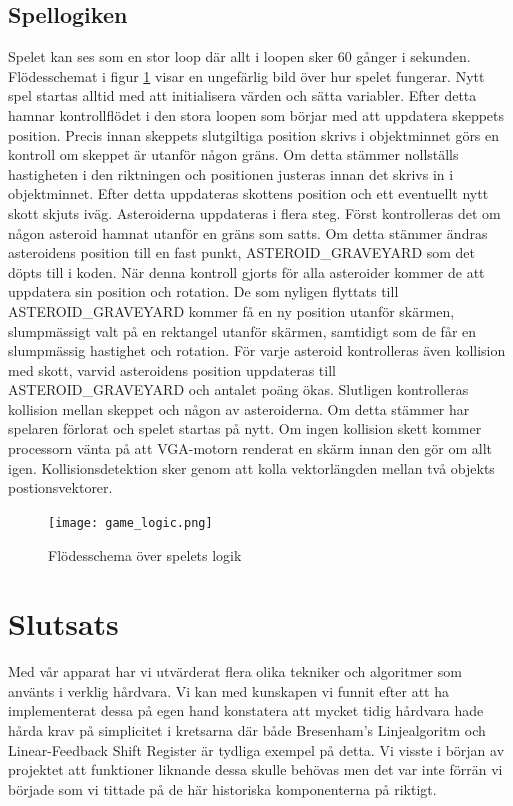 \documentclass[a4paper]{article}
\begin{document}
    \subsection{Spellogiken}
	Spelet kan ses som en stor loop där allt i loopen sker 60 gånger i sekunden. Flödesschemat
	i figur \ref{fig:game_logic} visar en ungefärlig bild över hur spelet fungerar. Nytt spel
	startas alltid med att initialisera värden och sätta variabler. Efter detta hamnar kontrollflödet
	i den stora loopen som börjar med att uppdatera skeppets position. Precis innan skeppets slutgiltiga
	position skrivs i objektminnet görs en kontroll om skeppet är utanför någon gräns. Om detta 
	stämmer nollställs hastigheten i den riktningen och positionen justeras innan det
	skrivs in i objektminnet. Efter detta uppdateras skottens position och ett eventuellt nytt 
	skott skjuts iväg. Asteroiderna uppdateras i flera steg. Först kontrolleras det om någon asteroid 
	hamnat utanför en gräns som satts. Om detta stämmer ändras asteroidens position till en fast punkt,
    ASTEROID\_GRAVEYARD som det döpts till i koden. När denna kontroll gjorts för alla asteroider kommer 
	de att uppdatera sin position och rotation. De som nyligen flyttats till ASTEROID\_GRAVEYARD kommer 
	få en ny position utanför skärmen, slumpmässigt valt på en rektangel utanför skärmen, samtidigt 
	som de får en slumpmässig hastighet och rotation. För varje asteroid kontrolleras även kollision
	med skott, varvid asteroidens position uppdateras till ASTEROID\_GRAVEYARD och antalet poäng ökas. 
	Slutligen kontrolleras kollision mellan skeppet och någon av asteroiderna. Om detta stämmer har 
	spelaren förlorat och spelet startas på nytt. Om ingen kollision skett kommer processorn vänta på att
	VGA-motorn renderat en skärm innan den gör om allt igen. Kollisionsdetektion sker genom att kolla 
	vektorlängden mellan två objekts postionsvektorer.
	
	\begin{figure}[H]
        \centering
        \texttt{[image: game\_logic.png]}
        \caption{Flödesschema över spelets logik}
        \label{fig:game_logic}
    \end{figure}

	\section{Slutsats}
        Med vår apparat har vi utvärderat flera olika tekniker och algoritmer som använts i verklig
        hårdvara. Vi kan med kunskapen vi funnit efter att ha implementerat dessa på egen hand
        konstatera att mycket tidig hårdvara hade hårda krav på simplicitet i kretsarna där både
        Bresenham's Linjealgoritm och Linear-Feedback Shift Register är tydliga exempel på detta. Vi
        visste i början av projektet att funktioner liknande dessa skulle behövas men det var inte
        förrän vi började som vi tittade på de här historiska komponenterna på riktigt.
\end{document}
